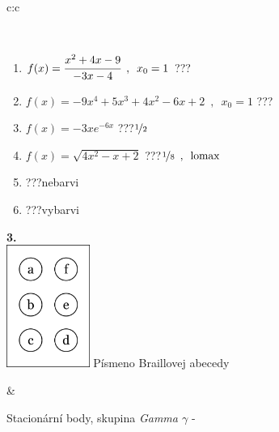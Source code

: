 \documentclass[10pt]{report}
\begin{document}
\begin{tabular}{c:c}
\begin{minipage}[c][104.5mm][t]{0.5\linewidth}
\begin{center}
\begin{minipage}{0.95\linewidth}
\begin{center}
\end{center}
\end{minipage}
\\[1mm]
\begin{minipage}{0.79\linewidth}
\begin{center}
\begin{varwidth}{\linewidth}
\begin{enumerate}
\normalsize
\item $f(x)=\cfrac{x^2+4x-9}{-3x-4}\enspace , \enspace x_0=1$\quad \dotfill\; ???\;\dotfill \quad {}
\item $f(x)=-9x^4+5x^3+4x^2-6x+2\enspace , \enspace x_0=1$\quad \dotfill\; ???\;\dotfill \quad {}
\item $f(x)=-3xe^{-6x}$\quad \dotfill\; ???\;\dotfill \quad $\nicefrac{1}{2}$
\item $f(x)=\sqrt{4x^2-x+2}$\quad \dotfill\; ???\;\dotfill \quad $\nicefrac{1}{8}\enspace , \enspace\mathrm{lomax}$
\item \quad \dotfill\; ???\;\dotfill \quad nebarvi
\item \quad \dotfill\; ???\;\dotfill \quad vybarvi
\end{enumerate}
\end{varwidth}
\end{center}
\end{minipage}
\begin{minipage}{0.20\linewidth}
\begin{center}
{\Huge\bfseries 3.} \\[2mm]
\includegraphics[height=40mm]{../images/braille.png}
{\small Písmeno Braillovej abecedy}
\end{center}
\end{minipage}
\end{center}
\end{minipage}
&
\begin{minipage}[c][104.5mm][t]{0.5\linewidth}
\begin{center}
\vspace{7mm}
{\huge Stacionární body, skupina \textit{Gamma $\gamma$} -}\\[5mm]

\end{center}
\end{minipage}
\end{tabular}
\end{document}
